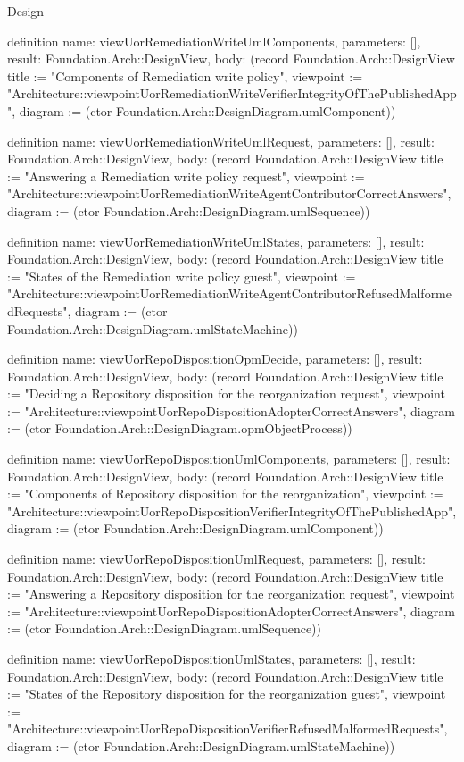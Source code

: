 \begin{lexlean}{Design}
\begin{semanticmodule}
definition{
  name: viewUorRemediationWriteUmlComponents,
  parameters: [],
  result: Foundation.Arch::DesignView,
  body: (record Foundation.Arch::DesignView {title := "Components of Remediation write policy", viewpoint := "Architecture::viewpointUorRemediationWriteVerifierIntegrityOfThePublishedApp", diagram := (ctor Foundation.Arch::DesignDiagram.umlComponent)})
}

definition{
  name: viewUorRemediationWriteUmlRequest,
  parameters: [],
  result: Foundation.Arch::DesignView,
  body: (record Foundation.Arch::DesignView {title := "Answering a Remediation write policy request", viewpoint := "Architecture::viewpointUorRemediationWriteAgentContributorCorrectAnswers", diagram := (ctor Foundation.Arch::DesignDiagram.umlSequence)})
}

definition{
  name: viewUorRemediationWriteUmlStates,
  parameters: [],
  result: Foundation.Arch::DesignView,
  body: (record Foundation.Arch::DesignView {title := "States of the Remediation write policy guest", viewpoint := "Architecture::viewpointUorRemediationWriteAgentContributorRefusedMalformedRequests", diagram := (ctor Foundation.Arch::DesignDiagram.umlStateMachine)})
}

definition{
  name: viewUorRepoDispositionOpmDecide,
  parameters: [],
  result: Foundation.Arch::DesignView,
  body: (record Foundation.Arch::DesignView {title := "Deciding a Repository disposition for the reorganization request", viewpoint := "Architecture::viewpointUorRepoDispositionAdopterCorrectAnswers", diagram := (ctor Foundation.Arch::DesignDiagram.opmObjectProcess)})
}

definition{
  name: viewUorRepoDispositionUmlComponents,
  parameters: [],
  result: Foundation.Arch::DesignView,
  body: (record Foundation.Arch::DesignView {title := "Components of Repository disposition for the reorganization", viewpoint := "Architecture::viewpointUorRepoDispositionVerifierIntegrityOfThePublishedApp", diagram := (ctor Foundation.Arch::DesignDiagram.umlComponent)})
}

definition{
  name: viewUorRepoDispositionUmlRequest,
  parameters: [],
  result: Foundation.Arch::DesignView,
  body: (record Foundation.Arch::DesignView {title := "Answering a Repository disposition for the reorganization request", viewpoint := "Architecture::viewpointUorRepoDispositionAdopterCorrectAnswers", diagram := (ctor Foundation.Arch::DesignDiagram.umlSequence)})
}

definition{
  name: viewUorRepoDispositionUmlStates,
  parameters: [],
  result: Foundation.Arch::DesignView,
  body: (record Foundation.Arch::DesignView {title := "States of the Repository disposition for the reorganization guest", viewpoint := "Architecture::viewpointUorRepoDispositionVerifierRefusedMalformedRequests", diagram := (ctor Foundation.Arch::DesignDiagram.umlStateMachine)})
}


\end{semanticmodule}
\end{lexlean}
